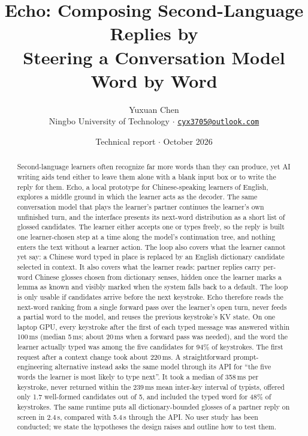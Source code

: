 \documentclass[11pt,a4paper]{article}
\title{\vspace{-1.1cm}\textbf{Echo: Composing Second-Language Replies by\\Steering a Conversation Model Word by Word}\vspace{-0.2cm}}
\author{Yuxuan Chen\\
\small Ningbo University of Technology \quad $\cdot$ \quad \href{mailto:cyx3705@outlook.com}{\texttt{cyx3705@outlook.com}}}
\date{\vspace{-0.8em}\small Technical report \quad $\cdot$ \quad October 2026}
\begin{document}
\maketitle
\thispagestyle{empty}
\begin{abstract}
Second-language learners often recognize far more words than they can produce, yet AI writing aids tend either to leave them alone with a blank input box or to write the reply for them. Echo, a local prototype for Chinese-speaking learners of English, explores a middle ground in which the learner acts as the decoder. The same conversation model that plays the learner's partner continues the learner's own unfinished turn, and the interface presents its next-word distribution as a short list of glossed candidates. The learner either accepts one or types freely, so the reply is built one learner-chosen step at a time along the model's continuation tree, and nothing enters the text without a learner action. The loop also covers what the learner cannot yet say: a Chinese word typed in place is replaced by an English dictionary candidate selected in context. It also covers what the learner reads: partner replies carry per-word Chinese glosses chosen from dictionary senses, hidden once the learner marks a lemma as known and visibly marked when the system falls back to a default. The loop is only usable if candidates arrive before the next keystroke. Echo therefore reads the next-word ranking from a single forward pass over the learner's open turn, never feeds a partial word to the model, and reuses the previous keystroke's KV state. On one laptop GPU, every keystroke after the first of each typed message was answered within 100\,ms (median 5\,ms; about 20\,ms when a forward pass was needed), and the word the learner actually typed was among the five candidates for 94\% of keystrokes. The first request after a context change took about 220\,ms. A straightforward prompt-engineering alternative instead asks the same model through its API for ``the five words the learner is most likely to type next''. It took a median of 358\,ms per keystroke, never returned within the 239\,ms mean inter-key interval of typists, offered only 1.7 well-formed candidates out of 5, and included the typed word for 48\% of keystrokes. The same runtime puts all dictionary-bounded glosses of a partner reply on screen in 2.4\,s, compared with 5.4\,s through the API. No user study has been conducted; we state the hypotheses the design raises and outline how to test them.
\end{abstract}
\end{document}
